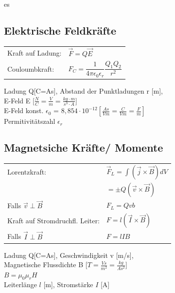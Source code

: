 es\documentclass[a4paper, fontsize=8pt, landscape]{scrartcl}
\begin{document}
\begin{multicols*}{4}
\subsection{Elektrische Feldkräfte}
    \begin{tabular}[t]{@{}l l}
    Kraft auf Ladung: & $\vec F = Q\vec E$\\
    Couloumbkraft: & $F_{C} = \dfrac{1}{4\pi \epsilon_0 \epsilon_r}\dfrac{Q_1Q_2}{r^2}$\\
    
    \end{tabular}
    \vspace{3em}
    
    \noindent
    Ladung Q[C=As], Abstand der Punktladungen r [m],\\ E-Feld E [$\frac{N}{C}=\frac{V}{m}=\frac{kg\cdot m}{s^3\cdot A}$]\\
    E-Feld konst. $\epsilon_0$ = $8,854\cdot10^{-12}[\frac{As}{Vm}=\frac{C}{Vm}= \frac{F}{m}]$\\
    Permitivitätszahl  $\epsilon_r$

\subsection{Magnetsiche Kräfte/ Momente}
    \begin{tabular}[t]{@{}l l}
    Lorentzkraft: & $\vec F_L =\int (\vec j \times \vec B) dV $\\
                &$= \pm Q(\vec v \times \vec B)  $\\
    Falls $\vec v \perp \vec B$ & $F_L = Qvb$\\
    Kraft auf Stromdruchfl. Leiter: & $F = l(\vec I \times \vec B)$\\
    Falls $\vec I \perp \vec B$ & $F = lIB$\\
    \end{tabular}
    \vspace{3em}
    
    \noindent
    Ladung Q[C=As], Geschwindigkeit v [m/s], \\
    Magnetische Flussdichte B [$T=\frac{Vs}{m^2}=\frac{kg}{As^2}$]\\
    $B = \mu_0 \mu_r H$ \\
    Leiterlänge $l$ [m], Stromstärke $I$ [A]\\\\
    

\end{multicols*}
\end{document}
